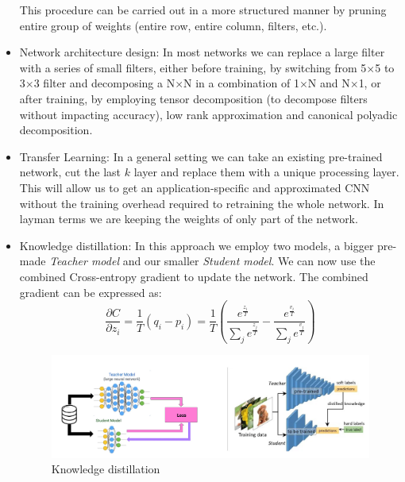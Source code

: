 \documentclass{article}
\begin{document}
\begin{itemize}
          This procedure can be carried out in a more structured manner by pruning entire group of weights (entire row, entire column, filters, etc.).
          \item Network architecture design: In most networks we can replace a large filter with a series of small filters, either before training, by switching from 5$\times$5 to 3$\times$3 filter and decomposing a N$\times$N in a combination of 1$\times$N and N$\times$1,
          or after training, by employing tensor decomposition (to decompose filters without impacting accuracy), low rank approximation and canonical polyadic decomposition.
          \item Transfer Learning: In a general setting we can take an existing pre-trained network, cut the last $k$ layer and replace them with a unique processing layer. This will allow us to get an application-specific and approximated CNN without the training overhead required to retraining the whole network.
          In layman terms we are keeping the weights of only part of the network.
          \item Knowledge distillation: In this approach we employ two models, a bigger pre-made \emph{Teacher model} and our smaller \emph{Student model}. We can now use the combined Cross-entropy gradient to update the network. The combined gradient can be expressed as:
          \begin{equation}
            \frac{\partial C}{\partial z_i} = \frac{1}{T} (q_i -p_i) = 
            \frac{1}{T} (\frac{e^{\frac{z_i}{T}}}{\sum_{j}^{}e^{\frac{z_j}{T}}}-
            \frac{e^{\frac{v_i}{T}}}{\sum_{j}^{}e^{\frac{v_j}{T}}})
          \end{equation}
          \begin{figure}[H]
            \includegraphics[scale=0.25]{../Images/KnowledgeDistillation.png}
            \centering
            \caption{Knowledge distillation}
          \end{figure}
        \end{itemize}
\end{document}
